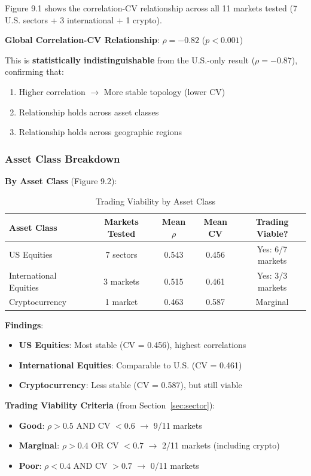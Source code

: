 Figure 9.1 shows the correlation-CV relationship across all 11 markets tested (7 U.S. sectors + 3 international + 1 crypto).

\textbf{Global Correlation-CV Relationship}: $\rho = -0.82$ ($p < 0.001$)

This is \textbf{statistically indistinguishable} from the U.S.-only result ($\rho = -0.87$), confirming that:

\begin{enumerate}
\item \checkmark Higher correlation $\rightarrow$ More stable topology (lower CV)
\item \checkmark Relationship holds across asset classes
\item \checkmark Relationship holds across geographic regions
\end{enumerate}

\subsubsection{Asset Class Breakdown}

\textbf{By Asset Class} (Figure 9.2):

\begin{table}[H]
\centering
\caption{Trading Viability by Asset Class}
\label{tab:asset-class-breakdown}
\begin{tabular}{@{}lcccc@{}}
\toprule
\textbf{Asset Class} & \textbf{Markets Tested} & \textbf{Mean $\rho$} & \textbf{Mean CV} & \textbf{Trading Viable?} \\
\midrule
US Equities & 7 sectors & 0.543 & 0.456 & Yes: 6/7 markets \\
International Equities & 3 markets & 0.515 & 0.461 & Yes: 3/3 markets \\
Cryptocurrency & 1 market & 0.463 & 0.587 & Marginal \\
\bottomrule
\end{tabular}
\end{table}

\textbf{Findings}:
\begin{itemize}
\item \textbf{US Equities}: Most stable (CV = 0.456), highest correlations
\item \textbf{International Equities}: Comparable to U.S. (CV = 0.461)
\item \textbf{Cryptocurrency}: Less stable (CV = 0.587), but still viable
\end{itemize}

\textbf{Trading Viability Criteria} (from Section~\ref{sec:sector}):
\begin{itemize}
\item \textbf{Good}: $\rho > 0.5$ AND CV $< 0.6$ $\rightarrow$ 9/11 markets
\item \textbf{Marginal}: $\rho > 0.4$ OR CV $< 0.7$ $\rightarrow$ 2/11 markets (including crypto)
\item \textbf{Poor}: $\rho < 0.4$ AND CV $> 0.7$ $\rightarrow$ 0/11 markets
\end{itemize}

